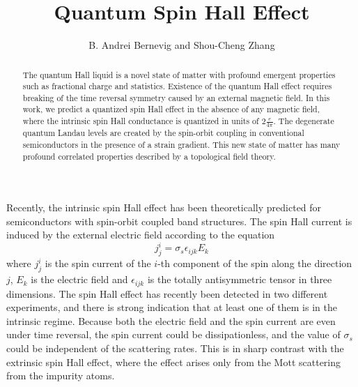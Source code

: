 \documentclass[prl,aps,amssymb,shownopacs,twocolumn]{revtex4}
\begin{document}



\title{Quantum Spin Hall Effect}

\author {B. Andrei Bernevig and Shou-Cheng Zhang}

\begin{abstract}
\begin{center}

\parbox{14cm}{The quantum Hall liquid is a novel state of matter
with profound emergent properties such as fractional charge and
statistics. Existence of the quantum Hall effect requires breaking
of the time reversal symmetry caused by an external magnetic field.
In this work, we predict a quantized spin Hall effect in the absence
of any magnetic field, where the intrinsic spin Hall conductance is
quantized in units of $2 \frac{e}{4\pi}$. The degenerate quantum
Landau levels are created by the spin-orbit coupling in conventional
semiconductors in the presence of a strain gradient. This new state
of matter has many profound correlated properties described by a
topological field theory.}

\end{center}
\end{abstract}


\maketitle

Recently, the intrinsic spin Hall effect has been theoretically
predicted for semiconductors with spin-orbit coupled band
structures\cite{murakami2003,sinova2004}. The spin Hall current is
induced by the external electric field according to the equation
\begin{equation}
j_j^i = \sigma_s \epsilon_{ijk} E_k \label{spin_response}
\end{equation}
where $j_j^i$ is the spin current of the $i$-th component of the
spin along the direction $j$, $E_k$ is the electric field and
$\epsilon_{ijk}$ is the totally antisymmetric tensor in three
dimensions. The spin Hall effect has recently been detected in two
different experiments\cite{kato2004A,wunderlich2004}, and there is
strong indication that at least one of them is in the intrinsic
regime\cite{bernevig2004A}. Because both the electric field and
the spin current are even under time reversal, the spin current
could be dissipationless, and the value of $\sigma_s$ could be
independent of the scattering rates. This is in sharp contrast
with the extrinsic spin Hall effect, where the effect arises only
from the Mott scattering from the impurity atoms\cite{mott1929}.
\end{document}

